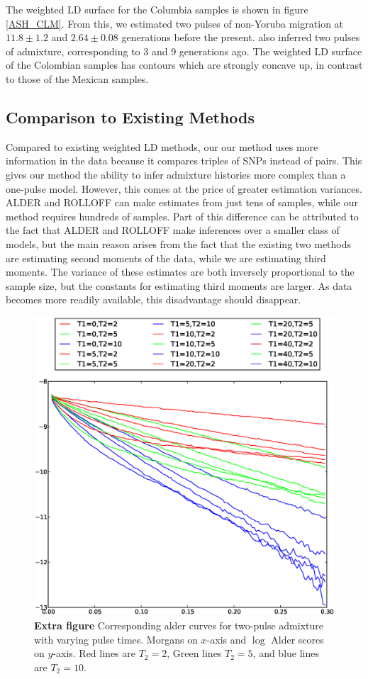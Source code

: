 \begin{table}
\begin{table}
The weighted LD surface for the Columbia samples is shown in figure
\ref{ASH_CLM}. From this, we estimated two pulses of non-Yoruba migration at
$11.8\pm 1.2$ and $2.64\pm0.08$ generations before the present.
\cite{gravel2013reconstructing} also inferred two pulses of admixture,
corresponding to 3 and 9 generations ago. The weighted LD surface of the
Colombian samples has contours which are strongly concave up, in contrast to
those of the Mexican samples. \subsection{Comparison to Existing Methods}
Compared to existing weighted LD methods, our our method uses more information
in the data because it compares triples of SNPs instead of pairs. This gives our
method the ability to infer admixture histories more complex than a one-pulse
model. However, this comes at the price of greater estimation variances. ALDER
and ROLLOFF can make estimates from just tens of samples, while our method
requires hundreds of samples. Part of this difference can be attributed to the
fact that ALDER and ROLLOFF make inferences over a smaller class of models, but
the main reason arises from the fact that the existing two methods are
estimating second moments of the data, while we are estimating third moments.
The variance of these estimates are both inversely proportional to the sample
size, but the constants for estimating third moments are larger. As data becomes
more readily available, this disadvantage should disappear.



\begin{figure} \includegraphics[scale=.6]{alder_Ts.eps} \caption{ {\bf Extra
figure} Corresponding alder curves for two-pulse admixture with varying pulse
times. Morgans on $x$-axis and $\log$ Alder scores on $y$-axis. Red lines are
$T_2=2$, Green lines $T_2=5$, and blue lines are $T_2=10$. } \end{figure}


\end{table}
\end{table}
